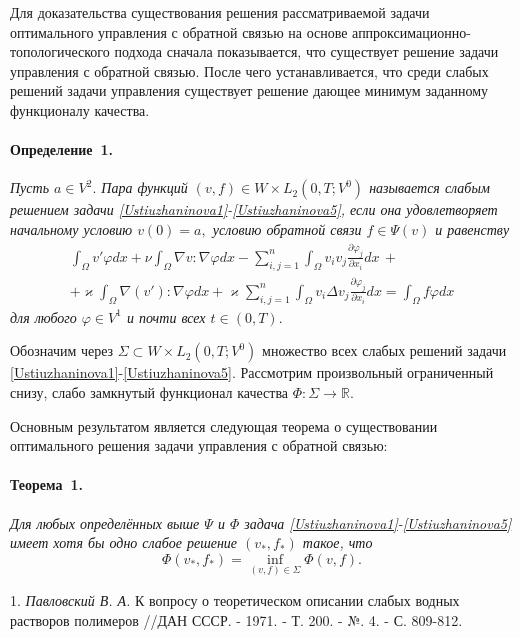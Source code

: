 Для доказательства существования решения рассматриваемой задачи оптимального управления с обратной связью на основе аппроксимационно-топологического подхода сначала показывается, что существует решение задачи управления с обратной связью. После чего устанавливается, что среди слабых решений задачи управления существует решение дающее минимум заданному функционалу качества.

\paragraph{Определение~1.} {\it Пусть $a\in V^2.$ Пара функций $(v,f)\in W\times {L}_2(0,T;V^{0})$ называется слабым решением задачи \eqref{Ustiuzhaninova1}-\eqref{Ustiuzhaninova5}, если она
удовлетворяет начальному условию $v(0)= a,$ условию обратной связи $ f\in \Psi (v)$ и равенству
\begin{multline*}
\int_\Omega v'\varphi dx+\nu\int_\Omega \nabla v:\nabla\varphi dx -\sum_{i,j=1}^n \int_\Omega v_i v_j \frac{\partial\varphi_j}{\partial x_i}dx\,+\\+\varkappa\int_\Omega \nabla\left(v'\right):\nabla\varphi dx + \varkappa\sum_{i,j=1}^n\int_\Omega v_i \Delta v_j \frac{\partial\varphi_j}{\partial x_i}dx=\int_\Omega f\varphi dx
\end{multline*}
для любого $\varphi \in V^1$ и почти всех $t\in (0,T).$
}


 
Обозначим через $\Sigma \subset W\times L_2(0,T;V^0)$ множество всех слабых решений задачи \eqref{Ustiuzhaninova1}-\eqref{Ustiuzhaninova5}. Рассмотрим произвольный ограниченный снизу, слабо замкнутый функционал качества $\Phi: \Sigma \to \mathbb{R}.$

Основным результатом является следующая теорема о существовании оптимального решения задачи управления с обратной связью:
\paragraph{Теорема~1.} {\it
Для любых определённых выше $\Psi$ и $\Phi$ задача \eqref{Ustiuzhaninova1}-\eqref{Ustiuzhaninova5} имеет хотя бы одно слабое решение $(v_*,f_*)$ такое, что
$$
\Phi (v_*,f_*) = \inf\limits_{(v,f)\in \Sigma}\Phi (v,f).
$$
}

\litlist

1. {\it Павловский В. А.} К вопросу о теоретическом описании слабых водных растворов полимеров //ДАН СССР. - 1971. - Т. 200. - №. 4. - С. 809-812.

